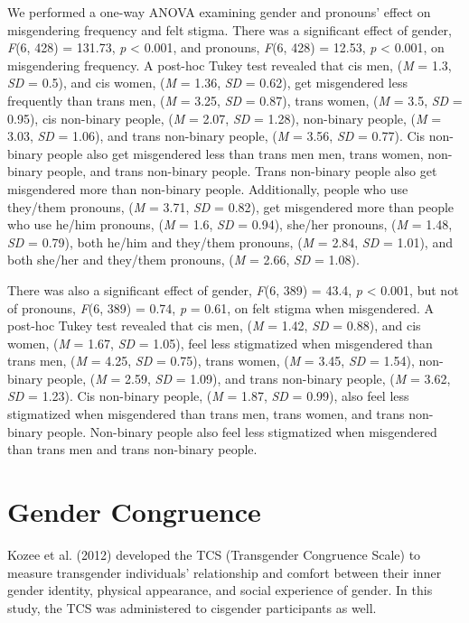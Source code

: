 \documentclass[12pt,twoside]{reedthesis}
\begin{document}
We performed a one-way ANOVA examining gender and pronouns' effect on misgendering frequency and felt stigma. There was a significant effect of gender, \emph{F}(6, 428) = 131.73, \emph{p} \textless{} 0.001, and pronouns, \emph{F}(6, 428) = 12.53, \emph{p} \textless{} 0.001, on misgendering frequency. A post-hoc Tukey test revealed that cis men, (\emph{M} = 1.3, \emph{SD} = 0.5), and cis women, (\emph{M} = 1.36, \emph{SD} = 0.62), get misgendered less frequently than trans men, (\emph{M} = 3.25, \emph{SD} = 0.87), trans women, (\emph{M} = 3.5, \emph{SD} = 0.95), cis non-binary people, (\emph{M} = 2.07, \emph{SD} = 1.28), non-binary people, (\emph{M} = 3.03, \emph{SD} = 1.06), and trans non-binary people, (\emph{M} = 3.56, \emph{SD} = 0.77). Cis non-binary people also get misgendered less than trans men men, trans women, non-binary people, and trans non-binary people. Trans non-binary people also get misgendered more than non-binary people. Additionally, people who use they/them pronouns, (\emph{M} = 3.71, \emph{SD} = 0.82), get misgendered more than people who use he/him pronouns, (\emph{M} = 1.6, \emph{SD} = 0.94), she/her pronouns, (\emph{M} = 1.48, \emph{SD} = 0.79), both he/him and they/them pronouns, (\emph{M} = 2.84, \emph{SD} = 1.01), and both she/her and they/them pronouns, (\emph{M} = 2.66, \emph{SD} = 1.08).

There was also a significant effect of gender, \emph{F}(6, 389) = 43.4, \emph{p} \textless{} 0.001, but not of pronouns, \emph{F}(6, 389) = 0.74, \emph{p} = 0.61, on felt stigma when misgendered. A post-hoc Tukey test revealed that cis men, (\emph{M} = 1.42, \emph{SD} = 0.88), and cis women, (\emph{M} = 1.67, \emph{SD} = 1.05), feel less stigmatized when misgendered than trans men, (\emph{M} = 4.25, \emph{SD} = 0.75), trans women, (\emph{M} = 3.45, \emph{SD} = 1.54), non-binary people, (\emph{M} = 2.59, \emph{SD} = 1.09), and trans non-binary people, (\emph{M} = 3.62, \emph{SD} = 1.23). Cis non-binary people, (\emph{M} = 1.87, \emph{SD} = 0.99), also feel less stigmatized when misgendered than trans men, trans women, and trans non-binary people. Non-binary people also feel less stigmatized when misgendered than trans men and trans non-binary people.

\hypertarget{gender-congruence}{%
\section{Gender Congruence}\label{gender-congruence}}

Kozee et al. (2012) developed the TCS (Transgender Congruence Scale) to measure transgender individuals' relationship and comfort between their inner gender identity, physical appearance, and social experience of gender. In this study, the TCS was administered to cisgender participants as well.
\end{document}
